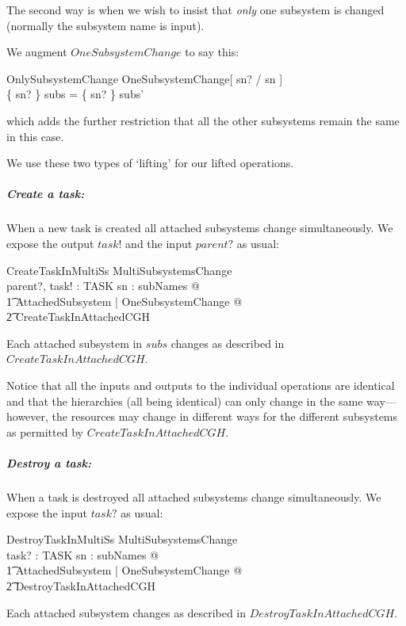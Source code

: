 \documentclass[a4paper,twoside,12pt]{article}
\begin{document}
The second way is when we wish to insist that \emph{only} one subsystem is changed (normally the subsystem name is input).

We augment
$OneSubsystemChange$ to say this:
\begin{schema}{OnlySubsystemChange}
OneSubsystemChange[ sn? / sn ] \\
\where
\{ sn? \} \ndres subs = \{ sn? \} \ndres subs' \\
\end{schema}
which adds the further restriction that all the other subsystems remain the same in this case.

We use these two types of `lifting' for our lifted operations.

\subparagraph{Create a task:}

When a new task is created all attached subsystems change simultaneously. We expose the output $task!$ and the input $parent?$ as usual:

\begin{schema}{CreateTaskInMultiSs}
MultiSubsystemsChange \\
parent?, task! : TASK
\where
\forall sn : subNames @ \\
\t1 \exists \Delta AttachedSubsystem | OneSubsystemChange @ \\
    \t2 CreateTaskInAttachedCGH
\end{schema}
Each attached subsystem in $subs$ changes as described in $CreateTaskInAttachedCGH$.

Notice that all the inputs and outputs to the individual operations are identical and that the hierarchies (all being identical)
can only change in the same way---however, the resources may change in different ways for the different subsystems as permitted by
$CreateTaskInAttachedCGH$.

\subparagraph{Destroy a task:}

When a task is destroyed all attached subsystems change simultaneously. We expose the input $task?$ as usual:
\begin{schema}{DestroyTaskInMultiSs}
MultiSubsystemsChange \\
task? : TASK
\where
\forall sn : subNames @ \\
\t1 \exists \Delta AttachedSubsystem | OneSubsystemChange @ \\
    \t2 DestroyTaskInAttachedCGH
\end{schema}
Each attached subsystem changes as described in $DestroyTaskInAttachedCGH$.
\end{document}
